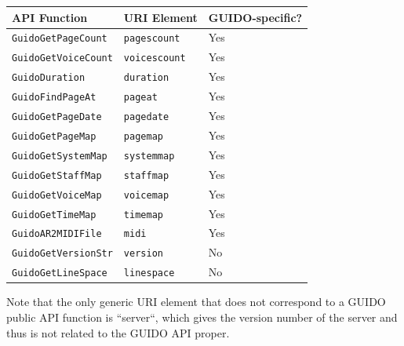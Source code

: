 \documentclass{article}
\begin{document}
\begin{longtable}{|l|l|l|}\hline
API Function & URI Element & GUIDO-specific? \\\hline
\verb=GuidoGetPageCount= & \verb=pagescount= & Yes \\\hline
\verb=GuidoGetVoiceCount= & \verb=voicescount= & Yes \\\hline
\verb=GuidoDuration= & \verb=duration= & Yes \\\hline
\verb=GuidoFindPageAt= & \verb=pageat= & Yes \\\hline
\verb=GuidoGetPageDate= & \verb=pagedate= & Yes \\\hline
\verb=GuidoGetPageMap= & \verb=pagemap= & Yes \\\hline
\verb=GuidoGetSystemMap= & \verb=systemmap= & Yes \\\hline
\verb=GuidoGetStaffMap= & \verb=staffmap= & Yes \\\hline
\verb=GuidoGetVoiceMap= & \verb=voicemap= & Yes \\\hline
\verb=GuidoGetTimeMap= & \verb=timemap= & Yes \\\hline
\verb=GuidoAR2MIDIFile= & \verb=midi= & Yes \\\hline
\verb=GuidoGetVersionStr= & \verb=version= & No \\\hline
\verb=GuidoGetLineSpace= & \verb=linespace= & No \\\hline
\end{longtable}
Note that the only generic URI element that does not correspond to a GUIDO public API function is ``server``, which gives the version number of the server and thus is not related to the GUIDO API proper.
\end{document}
